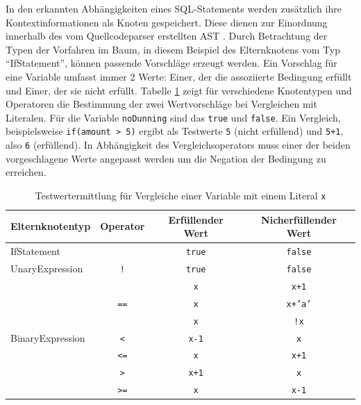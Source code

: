 In den erkannten Abhängigkeiten eines SQL-Statements werden zusätzlich ihre Kontextinformationen als Knoten gespeichert.
Diese dienen zur Einordnung innerhalb des vom Quellcodeparser erstellten AST \cite{Horschig2014}.
Durch Betrachtung der Typen der Vorfahren im Baum, in diesem Beispiel des Elternknotens vom Typ ``IfStatement'', können passende Vorschläge erzeugt werden.
Ein Vorschlag für eine Variable umfasst immer 2 Werte: Einer, der die assoziierte Bedingung erfüllt und Einer, der sie nicht erfüllt.
Tabelle \ref{tab:tableforgeneratedvalues} zeigt für verschiedene Knotentypen und Operatoren die Bestimmung der zwei Wertvorschläge bei Vergleichen mit Literalen.
Für die Variable \texttt{noDunning} sind das \texttt{true} und \texttt{false}.
Ein Vergleich, beispielsweise \texttt{if(amount > 5)} ergibt als Testwerte \texttt{5} (nicht erfüllend) und \texttt{5+1}, also \texttt{6} (erfüllend).
In Abhängigkeit des Vergleichsoperators muss einer der beiden vorgeschlagene Werte angepasst werden um die Negation der Bedingung zu erreichen.

\begin{table}[ht!]
	\centering
	\begin{tabular}{ |l|c|c|c| }
		\hline
		Elternknotentyp 								  & Operator 											& Erfüllender Wert 	& Nicherfüllender Wert\\
		\hline
		\multicolumn{2}{|l|}{IfStatement} 																& \texttt{true} 		& \texttt{false} 	\\
		\hline
		UnaryExpression 								  & \texttt{!} 										& \texttt{true} 		& \texttt{false} 	\\
		\hline
		\multirow{7}{*}{BinaryExpression} & \multirow{3}{*}{\texttt{==}} 	& \texttt{x} 				& \texttt{x+1}		\\ \cline{3-4}
																		  & 															& \texttt{x} 				& \texttt{x+'a'}	\\ \cline{3-4}
																		  & 															& \texttt{x} 				& \texttt{!x}			\\ \cline{2-4}
																		  & \texttt{<} 										& \texttt{x-1} 			& \texttt{x}			\\ \cline{2-4}
																		  & \texttt{<=} 									& \texttt{x} 				& \texttt{x+1}		\\ \cline{2-4}
																		  & \texttt{>} 										& \texttt{x+1} 			& \texttt{x}			\\ \cline{2-4}
																		  & \texttt{>=} 									& \texttt{x} 				& \texttt{x-1}		\\
		\hline
	\end{tabular}
	\caption{Testwertermittlung für Vergleiche einer Variable mit einem Literal \texttt{x}}
	\label{tab:tableforgeneratedvalues}
\end{table}

